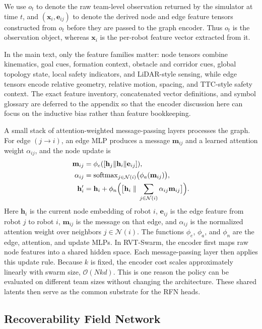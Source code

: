 \documentclass{ieeeaccess}
\newcommand{\cN}{\mathcal{N}}
\begin{document}
We use $o_t$ to denote the raw team-level observation returned by the simulator at time $t$, and $(\mathbf{x}_i,\mathbf{e}_{ij})$ to denote the derived node and edge feature tensors constructed from $o_t$ before they are passed to the graph encoder. Thus $o_t$ is the observation object, whereas $\mathbf{x}_i$ is the per-robot feature vector extracted from it.

In the main text, only the feature families matter: node tensors combine kinematics, goal cues, formation context, obstacle and corridor cues, global topology state, local safety indicators, and LiDAR-style sensing, while edge tensors encode relative geometry, relative motion, spacing, and TTC-style safety context. The exact feature inventory, concatenated vector definitions, and symbol glossary are deferred to the appendix so that the encoder discussion here can focus on the inductive bias rather than feature bookkeeping.

A small stack of attention-weighted message-passing layers processes the
graph. For edge $(j \rightarrow i)$, an edge MLP produces a message
$\mathbf{m}_{ij}$ and a learned attention weight $\alpha_{ij}$, and the
node update is
\begin{align}
\mathbf{m}_{ij} &= \phi_e([\mathbf{h}_j \| \mathbf{h}_i \|
\mathbf{e}_{ij}]), \\
\alpha_{ij} &= \operatorname{softmax}_{j \in \cN(i)}
\bigl(\phi_a(\mathbf{m}_{ij})\bigr), \\
\mathbf{h}_i' &= \mathbf{h}_i +
\phi_n\Bigl(\bigl[\mathbf{h}_i \;\|\;
\sum_{j\in\cN(i)}\alpha_{ij}\mathbf{m}_{ij}\bigr]\Bigr).
\end{align}
Here $\mathbf{h}_i$ is the current node embedding of robot $i$,
$\mathbf{e}_{ij}$ is the edge feature from robot $j$ to robot $i$,
$\mathbf{m}_{ij}$ is the message on that edge, and $\alpha_{ij}$ is the
normalized attention weight over neighbors $j\in\cN(i)$. The functions
$\phi_e$, $\phi_a$, and $\phi_n$ are the edge, attention, and update
MLPs. In RVT-Swarm, the encoder first maps raw node features into a
shared hidden space. Each message-passing layer then applies this
update rule. Because $k$ is fixed, the encoder cost scales
approximately linearly with swarm size, $\mathcal{O}(Nkd)$. This is
one reason the policy can be evaluated on different team sizes without
changing the architecture. These shared latents then serve as the
common substrate for the RFN heads.

\subsection{Recoverability Field Network}
\label{sec:rfn}
\end{document}
